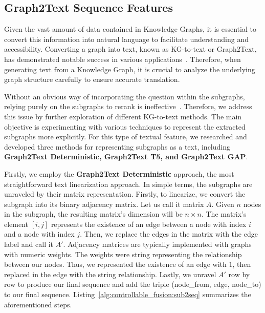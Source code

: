 \subsection{Graph2Text Sequence Features}
\label{sec:controllable_fusion:g2t_seq} 
Given the vast amount of data contained in Knowledge Graphs, it is essential to convert this information into natural language to facilitate understanding and accessibility. Converting a graph into text, known as KG-to-text or Graph2Text, has demonstrated notable success in various applications~\cite{DBLP:journals/corr/abs-2309-11206}. Therefore, when generating text from a Knowledge Graph, it is crucial to analyze the underlying graph structure carefully to ensure accurate translation.

Without an obvious way of incorporating the question within the subgraphs, relying purely on the subgraphs to rerank is ineffective~\cite{DBLP:conf/paclic/SalnikovLRNBMP23-originalpaper}. Therefore, we address this issue by further exploration of different KG-to-text methods. The main objective is experimenting with various techniques to represent the extracted subgraphs more explicitly. For this type of textual feature, we researched and developed three methods for representing subgraphs as a text, including \textbf{Graph2Text Deterministic,  Graph2Text T5, and  Graph2Text GAP}.

Firstly, we employ the \textbf{Graph2Text Deterministic} approach, the most straightforward text linearization approach. In simple terms, the subgraphs are unraveled by their matrix representation. Firstly, to linearize, we convert the subgraph into its binary adjacency matrix. Let us call it matrix $A$. 
Given $n$ nodes in the subgraph, the resulting matrix's dimension will be $n \times n$. The matrix's element $[i, j]$ represents the existence of an edge between a node with index $i$ and a node with index $j$. Then, we replace the edges in the matrix with the edge label and call it $A'$. 
Adjacency matrices are typically implemented with graphs with numeric weights. The weights were string representing the relationship between our nodes. Thus, we represented the existence of an edge with $1$, then replaced in the edge with the string relationship.
Lastly, we unravel $A'$ row by row to produce our final sequence and add the triple (node\_from, edge, node\_to) to our final sequence. Listing~\ref{alg:controllable_fusion:sub2seq} summarizes the aforementioned steps. 


